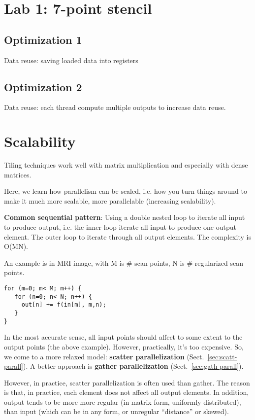 \section{Lab 1: 7-point stencil}
\label{sec:test-7-point}


\subsection{Optimization 1}
\label{sec:optimization-1}

Data reuse: saving loaded data into registers


\subsection{Optimization 2}
\label{sec:optimization-2}

Data reuse: each thread compute multiple outputs to increase data
reuse. 


\section{Scalability}
\label{sec:scalability}

Tiling techniques work well with matrix multiplication and especially
with dense matrices. 

Here, we learn how parallelism can be scaled, i.e. how you turn things
around to make it much more scalable, more parallelable (increasing
scalability). 

{\bf Common sequential pattern}: Using a double nested loop to iterate
all input to produce output, i.e. the inner loop iterate all input to
produce one output element. The outer loop to iterate through all
output elements. The complexity is O(MN).

An example is in MRI image, with M is \# scan points, N is \#
regularized scan points.
\begin{lstlisting}
for (m=0; m< M; m++) {
   for (n=0; n< N; n++) {
     out[n] += f(in[m], m,n);
   }
}
\end{lstlisting}

In the most accurate sense, all input points should affect to some
extent to the output points (the above example). However, practically,
it's too expensive. So, we come to a more relaxed model:
{\bf scatter parallelization} (Sect.~\ref{sec:scatt-parall}). A better
approach is {\bf gather parallelization}
(Sect.~\ref{sec:gath-parall}).

However, in practice, scatter parallelization is often used than
gather. The reason is that, in practice, each element does not affect
all output elements. In addition, output tends to be more more regular
(in matrix form, uniformly distributed), than input (which can be in
any form, or unregular ``distance'' or skewed).

